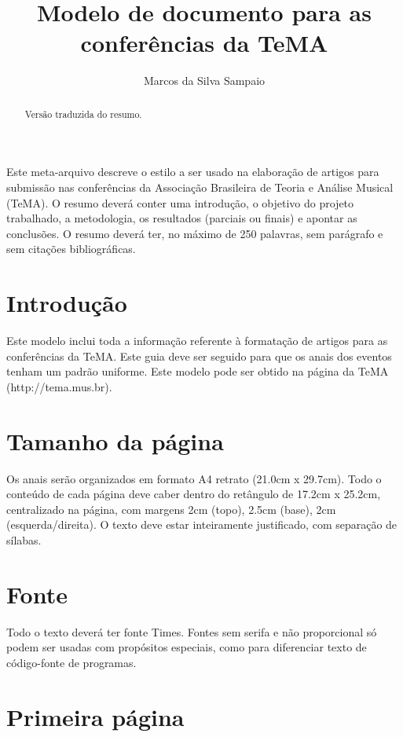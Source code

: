 \documentclass[12pt]{article}
\title{Modelo de documento para as conferências da TeMA}
\author{Marcos da Silva Sampaio\inst{1}}
\begin{document}
\maketitle

\begin{abstract}
  Versão traduzida do resumo.
\end{abstract}

\begin{resumo}
  Este meta-arquivo descreve o estilo a ser usado na elaboração de
  artigos para submissão nas conferências da Associação Brasileira de
  Teoria e Análise Musical (TeMA). O resumo deverá conter uma
  introdução, o objetivo do projeto trabalhado, a metodologia, os
  resultados (parciais ou finais) e apontar as conclusões. O resumo
  deverá ter, no máximo de 250 palavras, sem parágrafo e sem citações
  bibliográficas.
\end{resumo}


\section{Introdução}
\label{sec:gen}

Este modelo inclui toda a informação referente à formatação de artigos
para as conferências da TeMA. Este guia deve ser seguido para que os
anais dos eventos tenham um padrão uniforme. Este modelo pode ser
obtido na página da TeMA (http://tema.mus.br).


\section{Tamanho da página}
\label{sec:tamanho-pagina}

Os anais serão organizados em formato A4 retrato (21.0cm x 29.7cm).
Todo o conteúdo de cada página deve caber dentro do retângulo de
17.2cm x 25.2cm, centralizado na página, com margens 2cm (topo), 2.5cm
(base), 2cm (esquerda/direita). O texto deve estar inteiramente
justificado, com separação de sílabas.

\section{Fonte}
\label{sec:fonte}

Todo o texto deverá ter fonte Times. Fontes sem serifa e não
proporcional só podem ser usadas com propósitos especiais, como para
diferenciar texto de código-fonte de programas.

\section{Primeira página}
\end{document}
